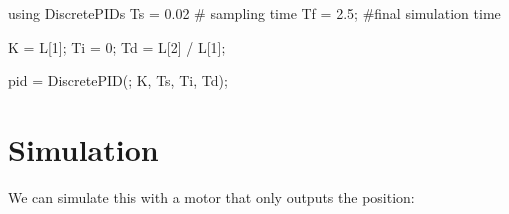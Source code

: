 \documentclass[
  a4paper,
  DIV=11,
  numbers=noendperiod]{scrreprt}
\newenvironment{Shaded}{\begin{snugshade}}{\end{snugshade}}
\newcommand{\BuiltInTok}[1]{\textcolor[rgb]{0.00,0.23,0.31}{#1}}
\newcommand{\CommentTok}[1]{\textcolor[rgb]{0.37,0.37,0.37}{#1}}
\newcommand{\FloatTok}[1]{\textcolor[rgb]{0.68,0.00,0.00}{#1}}
\newcommand{\FunctionTok}[1]{\textcolor[rgb]{0.28,0.35,0.67}{#1}}
\newcommand{\ImportTok}[1]{\textcolor[rgb]{0.00,0.46,0.62}{#1}}
\newcommand{\NormalTok}[1]{\textcolor[rgb]{0.00,0.23,0.31}{#1}}
\newcommand{\OperatorTok}[1]{\textcolor[rgb]{0.37,0.37,0.37}{#1}}
\begin{document}
\begin{Shaded}
\begin{Highlighting}[]
\ImportTok{using} \BuiltInTok{DiscretePIDs}
\NormalTok{Ts }\OperatorTok{=} \FloatTok{0.02} \CommentTok{\# sampling time}
\NormalTok{Tf }\OperatorTok{=} \FloatTok{2.5}\NormalTok{; }\CommentTok{\#final simulation time}

\NormalTok{K }\OperatorTok{=}\NormalTok{ L[}\FloatTok{1}\NormalTok{];}
\NormalTok{Ti }\OperatorTok{=} \FloatTok{0}\NormalTok{;}
\NormalTok{Td }\OperatorTok{=}\NormalTok{ L[}\FloatTok{2}\NormalTok{] }\OperatorTok{/}\NormalTok{ L[}\FloatTok{1}\NormalTok{];}

\NormalTok{pid }\OperatorTok{=} \FunctionTok{DiscretePID}\NormalTok{(; K, Ts, Ti, Td);}
\end{Highlighting}
\end{Shaded}

\section{Simulation}\label{simulation-1}

We can simulate this with a motor that only outputs the position:
\end{document}
